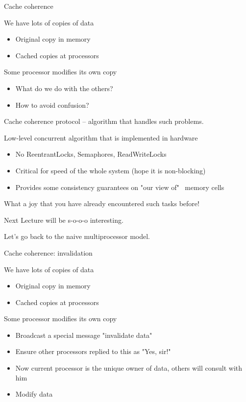 \begin{frame}{Cache coherence}

We have lots of copies of data
\begin{itemize}
  \item Original copy in memory 
  \item Cached copies at processors
\end{itemize}

\pause

Some processor modifies its own copy
\begin{itemize}
  \item What do we do with the others?
  \item How to avoid confusion?
\end{itemize}

\pause

Cache coherence protocol -- algorithm that handles such problems.

\pause

Low-level concurrent algorithm that is implemented in hardware
\begin{itemize}
  \pause
  \item No ReentrantLocks, Semaphores, ReadWriteLocks
  \item Critical for speed of the whole system (hope it is non-blocking)
  \pause
  \item Provides some consistency guarantees on "our view of" \ memory cells
\end{itemize}
\pause

What a joy that you have already encountered such tasks before!

\pause

Next Lecture will be s-o-o-o interesting.

\pause

Let's go back to the naive multiprocessor model.

\end{frame}

\begin{frame}{Cache coherence: invalidation}

We have lots of copies of data
\begin{itemize}
  \item Original copy in memory 
  \item Cached copies at processors
\end{itemize}

Some processor modifies its own copy

\pause
\begin{itemize}
  \item Broadcast a special message "invalidate data"
  \pause
  \item Ensure other processors replied to this as "Yes, sir!"
  \pause
  \item Now current processor is the unique owner of data, others will consult with him
  \pause
  \item Modify data
\end{itemize}
\end{frame}


